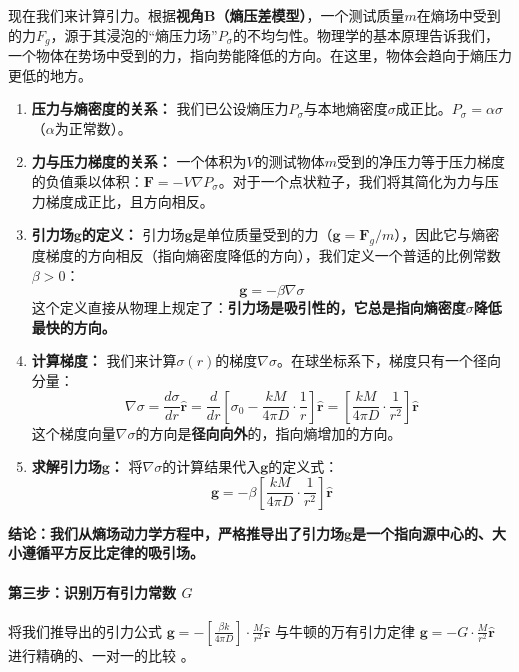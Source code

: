 \documentclass[11pt, a4paper]{article}
\begin{document}
现在我们来计算引力。根据\textbf{视角B（熵压差模型）}，一个测试质量$m$在熵场中受到的力$F_g$，源于其浸泡的“熵压力场”$P_\sigma$的不均匀性。物理学的基本原理告诉我们，一个物体在势场中受到的力，指向势能降低的方向。在这里，物体会趋向于熵压力更低的地方。

\begin{enumerate}
    \item \textbf{压力与熵密度的关系：} 我们已公设熵压力$P_\sigma$与本地熵密度$\sigma$成正比。$P_\sigma = \alpha \sigma$（$\alpha$为正常数）。
    \item \textbf{力与压力梯度的关系：} 一个体积为$V$的测试物体$m$受到的净压力等于压力梯度的负值乘以体积：$\mathbf{F} = -V \nabla P_\sigma$。对于一个点状粒子，我们将其简化为力与压力梯度成正比，且方向相反。
    \item \textbf{引力场$\mathbf{g}$的定义：} 引力场$\mathbf{g}$是单位质量受到的力（$\mathbf{g} = \mathbf{F}_g/m$），因此它与熵密度梯度的方向相反（指向熵密度降低的方向），我们定义一个普适的比例常数$\beta > 0$：
    \[
    \mathbf{g} = -\beta \nabla\sigma
    \]
    这个定义直接从物理上规定了：\textbf{引力场是吸引性的，它总是指向熵密度$\sigma$降低最快的方向。}

    \item \textbf{计算梯度：} 我们来计算$\sigma(r)$的梯度$\nabla\sigma$。在球坐标系下，梯度只有一个径向分量：
    \[
    \nabla\sigma = \frac{d\sigma}{dr} \hat{\mathbf{r}} = \frac{d}{dr} \left[\sigma_0 - \frac{kM}{4\pi D} \cdot \frac{1}{r}\right] \hat{\mathbf{r}} = \left[ \frac{kM}{4\pi D} \cdot \frac{1}{r^2} \right] \hat{\mathbf{r}}
    \]
    这个梯度向量$\nabla\sigma$的方向是\textbf{径向向外}的，指向熵增加的方向。

    \item \textbf{求解引力场$\mathbf{g}$：} 将$\nabla\sigma$的计算结果代入$\mathbf{g}$的定义式：
    \[
    \mathbf{g} = -\beta \left[ \frac{kM}{4\pi D} \cdot \frac{1}{r^2} \right] \hat{\mathbf{r}}
    \]
\end{enumerate}

\textbf{结论：我们从熵场动力学方程中，严格推导出了引力场$\mathbf{g}$是一个指向源中心的、大小遵循平方反比定律的吸引场。}

\paragraph{第三步：识别万有引力常数 $G$}

将我们推导出的引力公式 $\mathbf{g} = - \left[\frac{\beta k}{4\pi D}\right] \cdot \frac{M}{r^2} \hat{\mathbf{r}}$ 与牛顿的万有引力定律 $\mathbf{g} = - G \cdot \frac{M}{r^2} \hat{\mathbf{r}}$ 进行精确的、一对一的比较 \cite{Newton1687}。
\end{document}
